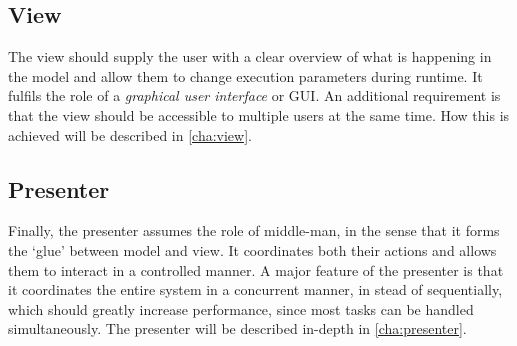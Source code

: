 \documentclass[a4paper, openany, oneside]{memoir}
\begin{document}
\subsection{View}
\label{sub:view}
The view should supply the user with a clear overview of what is happening in the model and allow them to change execution parameters during runtime. It fulfils the role of a \emph{graphical user interface} or GUI. An additional requirement is that the view should be accessible to multiple users at the same time. How this is achieved will be described in \cref{cha:view}.

\subsection{Presenter}
\label{sub:presenter}
Finally, the presenter assumes the role of middle-man, in the sense that it forms the `glue' between model and view. It coordinates both their actions and allows them to interact in a controlled manner. A major feature of the presenter is that it coordinates the entire system in a concurrent manner, in stead of sequentially, which should greatly increase performance, since most tasks can be handled simultaneously. The presenter will be described in-depth in \cref{cha:presenter}.
\end{document}
